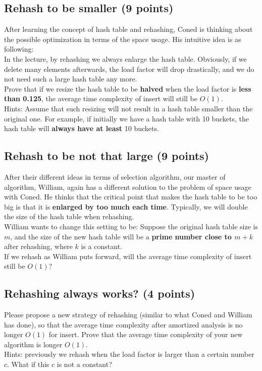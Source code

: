 \documentclass[11pt]{exam}
\begin{document}
\subsection{Rehash to be smaller (9 points)}
After learning the concept of hash table and rehashing, Coned is thinking about the possible optimization in terms of the space usage. His intuitive idea is as following:\\
In the lecture, by rehashing we always enlarge the hash table. Obviously, if we delete many elements afterwards, the load factor will drop drastically, and we do not need such a large hash table any more.\\
Prove that if we resize the hash table to be \textbf{halved} when the load factor is \textbf{less than 0.125}, the average time complexity of insert will still be $O(1)$.\\
Hints: Assume that such resizing will not result in a hash table smaller than the original one. For example, if initially we have a hash table with 10 buckets, the hash table will \textbf{always have at least} 10 buckets.
\begin{solution}
\end{solution}
\subsection{Rehash to be not that large (9 points)}
After their different ideas in terms of selection algorithm, our master of algorithm, William, again has a different solution to the problem of space usage with Coned. He thinks that the critical point that makes the hash table to be too big is that it is \textbf{enlarged by too much each time}. Typically, we will double the size of the hash table when rehashing.\\
William wants to change this setting to be: Suppose the original hash table size is $m$, and the size of the new hash table will be a \textbf{prime number close to $m+k$} after rehashing, where $k$ is a constant.\\
If we rehash as William puts forward, will the average time complexity of insert still be $O(1)$?
\begin{solution}
\end{solution}
\subsection{Rehashing always works? (4 points)}
Please propose a new strategy of rehashing (similar to what Coned and William has done), so that the average time complexity after amortized analysis is no longer $O(1)$ for insert. Prove that the average time complexity of your new algorithm is longer $O(1)$.\\
Hints: previously we rehash when the load factor is larger than a certain number $c$. What if this $c$ is not a constant?
\begin{solution}
\end{solution}
\end{document}
